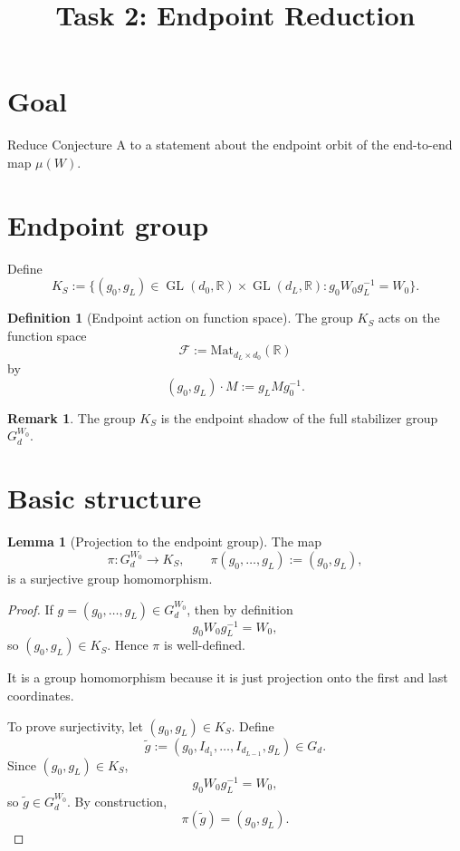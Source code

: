 \documentclass{article}
\title{Task 2: Endpoint Reduction}
\date{}
\newcommand{\GL}{\operatorname{GL}}
\newcommand{\R}{\mathbb{R}}
\newcommand{\Mat}{\mathrm{Mat}}
\theoremstyle{definition}
\newtheorem{lemma}[theorem]{Lemma}
\newtheorem{definition}[theorem]{Definition}
\newtheorem{remark}[theorem]{Remark}
\begin{document}
\maketitle

\section{Goal}

Reduce Conjecture A to a statement about the endpoint orbit of the end-to-end map $\mu(W)$.

\section{Endpoint group}

Define
\[
K_S:=\{(g_0,g_L)\in \GL(d_0,\R)\times \GL(d_L,\R) : g_0W_0g_L^{-1}=W_0\}.
\]

\begin{definition}[Endpoint action on function space]
The group $K_S$ acts on the function space
\[
\mathcal F:=\Mat_{d_L\times d_0}(\R)
\]
by
\[
(g_0,g_L)\cdot M:=g_LMg_0^{-1}.
\]
\end{definition}

\begin{remark}
The group $K_S$ is the endpoint shadow of the full stabilizer group $G_d^{W_0}$.
\end{remark}

\section{Basic structure}

\begin{lemma}[Projection to the endpoint group]\label{lem:endpoint-projection}
The map
\[
\pi:G_d^{W_0}\to K_S,
\qquad
\pi(g_0,\dots,g_L):=(g_0,g_L),
\]
is a surjective group homomorphism.
\end{lemma}

\begin{proof}
If $g=(g_0,\dots,g_L)\in G_d^{W_0}$, then by definition
\[
g_0W_0g_L^{-1}=W_0,
\]
so $(g_0,g_L)\in K_S$. Hence $\pi$ is well-defined.

It is a group homomorphism because it is just projection onto the first and last coordinates.

To prove surjectivity, let $(g_0,g_L)\in K_S$. Define
\[
\widetilde g:=(g_0,I_{d_1},\dots,I_{d_{L-1}},g_L)\in G_d.
\]
Since $(g_0,g_L)\in K_S$,
\[
g_0W_0g_L^{-1}=W_0,
\]
so $\widetilde g\in G_d^{W_0}$. By construction,
\[
\pi(\widetilde g)=(g_0,g_L).
\]
\end{proof}
\end{document}
